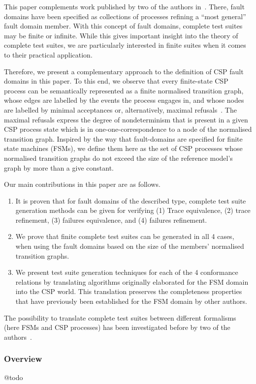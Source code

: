This paper complements work published by two of the authors 
in~\cite{DBLP:conf/pts/CavalcantiS17}. There, fault domains have been specified 
as collections of processes refining a  ``most general'' fault domain member. With this concept of fault domains, complete test suites may be finite or infinite. While this gives 
important insight into the theory of complete test suites, we are particularly interested
in finite suites when it comes to their practical application.

Therefore, we present a complementary approach to the definition of CSP fault
domains in this paper. To this end, we observe that 
every finite-state CSP process can be semantically represented as a finite
normalised transition graph, whose edges are labelled by the events the process engages 
in, and whose nodes are labelled by minimal acceptances or, alternatively, 
maximal refusals~\cite{Roscoe:1994:CME:197600}. 
The maximal refusals  express the degree of nondeterminism
that is present in a given CSP process state which is in one-one-correspondence to
a node of the normalised transition graph. 
Inspired by the way that fault-domains are specified for finite state machines (FSMs), 
we define 
them here as the set of CSP processes whose normalised transition graphs do not exceed the
size of the reference model's graph by more than a give constant. 

Our main contributions in this paper are as follows.
\begin{enumerate}
\item It is proven that for fault domains of the described type, complete test suite 
generation methods can be given for verifying (1) Trace equivalence, (2) trace refinement,
(3) failures equivalence, and (4) failures refinement.

\item We prove that finite complete  test suites can be generated in all 4 cases, when using the fault domains based on the size of the members' normalised transition graphs. 

\item We present test suite generation techniques for each of the 4 conformance relations
by translating algorithms originally elaborated for the FSM domain into the CSP world. This 
translation preserves the completeness properties that have previously been established
for the FSM domain
by other authors. 
\end{enumerate}

The possibility to translate complete test suites between different formalisms (here FSMs and CSP processes) has been investigated before by two of the authors~\cite{Huang2017}.



\subsubsection*{Overview}

@todo



